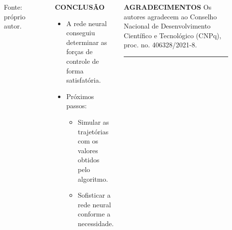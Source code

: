\documentclass[serif,20pt]{beamer}
\begin{document}
\begin{frame}[t]
\begin{columns}[t]
\begin{block}{}
\begin{figure}[H]
    {\footnotesize Fonte: próprio autor.}

    \label{fig:comparison}
\end{figure}
\end{block}

\begin{block}{\centering\bfseries CONCLUSÃO}
\vspace{1cm}
\begin{itemize}\justifying
    \item A rede neural conseguiu determinar as forças de controle de forma satisfatória.
    \item Próximos passos:
    \begin{itemize}\justifying
        \item Simular as trajetórias com os valores obtidos pelo algoritmo.
        \item Sofisticar a rede neural conforme a necessidade.
    \end{itemize}
\end{itemize}
\vspace{1cm}
\end{block}

\begin{block}{\centering\bfseries AGRADECIMENTOS}\justifying
\vspace{1cm}
Os autores agradecem ao Conselho Nacional de Desenvolvimento Científico e Tecnológico (CNPq), proc. no. 406328/2021-8.

\rule{10cm}{0.4pt}


{\small}
\end{block}


\end{columns}    
\end{frame}
\end{document}
